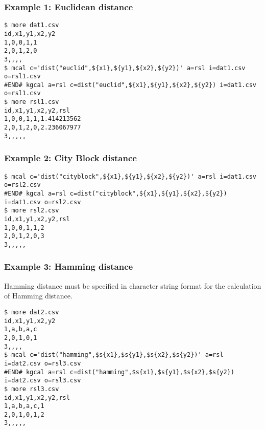 \subsubsection*{Example 1: Euclidean distance }



\begin{Verbatim}[baselinestretch=0.7,frame=single]
$ more dat1.csv
id,x1,y1,x2,y2
1,0,0,1,1
2,0,1,2,0
3,,,,
$ mcal c='dist("euclid",${x1},${y1},${x2},${y2})' a=rsl i=dat1.csv o=rsl1.csv
#END# kgcal a=rsl c=dist("euclid",${x1},${y1},${x2},${y2}) i=dat1.csv o=rsl1.csv
$ more rsl1.csv
id,x1,y1,x2,y2,rsl
1,0,0,1,1,1.414213562
2,0,1,2,0,2.236067977
3,,,,,
\end{Verbatim}
\subsubsection*{Example 2: City Block distance}



\begin{Verbatim}[baselinestretch=0.7,frame=single]
$ mcal c='dist("cityblock",${x1},${y1},${x2},${y2})' a=rsl i=dat1.csv o=rsl2.csv
#END# kgcal a=rsl c=dist("cityblock",${x1},${y1},${x2},${y2}) i=dat1.csv o=rsl2.csv
$ more rsl2.csv
id,x1,y1,x2,y2,rsl
1,0,0,1,1,2
2,0,1,2,0,3
3,,,,,
\end{Verbatim}
\subsubsection*{Example 3: Hamming distance}

Hamming distance must be specified in character string format for the calculation of Hamming distance.


\begin{Verbatim}[baselinestretch=0.7,frame=single]
$ more dat2.csv
id,x1,y1,x2,y2
1,a,b,a,c
2,0,1,0,1
3,,,,
$ mcal c='dist("hamming",$s{x1},$s{y1},$s{x2},$s{y2})' a=rsl i=dat2.csv o=rsl3.csv
#END# kgcal a=rsl c=dist("hamming",$s{x1},$s{y1},$s{x2},$s{y2}) i=dat2.csv o=rsl3.csv
$ more rsl3.csv
id,x1,y1,x2,y2,rsl
1,a,b,a,c,1
2,0,1,0,1,2
3,,,,,
\end{Verbatim}
